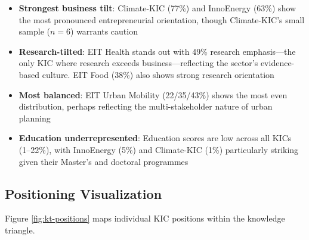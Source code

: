 \documentclass[../main.tex]{subfiles}
\begin{document}
\begin{itemize}
    \item \textbf{Strongest business tilt}: Climate-KIC (77\%) and InnoEnergy (63\%) show the most pronounced entrepreneurial orientation, though Climate-KIC's small sample ($n=6$) warrants caution

    \item \textbf{Research-tilted}: EIT Health stands out with 49\% research emphasis---the only KIC where research exceeds business---reflecting the sector's evidence-based culture. EIT Food (38\%) also shows strong research orientation

    \item \textbf{Most balanced}: EIT Urban Mobility (22/35/43\%) shows the most even distribution, perhaps reflecting the multi-stakeholder nature of urban planning

    \item \textbf{Education underrepresented}: Education scores are low across all KICs (1--22\%), with InnoEnergy (5\%) and Climate-KIC (1\%) particularly striking given their Master's and doctoral programmes
\end{itemize}

\subsection{Positioning Visualization}

Figure \ref{fig:kt-positions} maps individual KIC positions within the knowledge triangle.

\begin{center}
\end{center}
\end{document}
